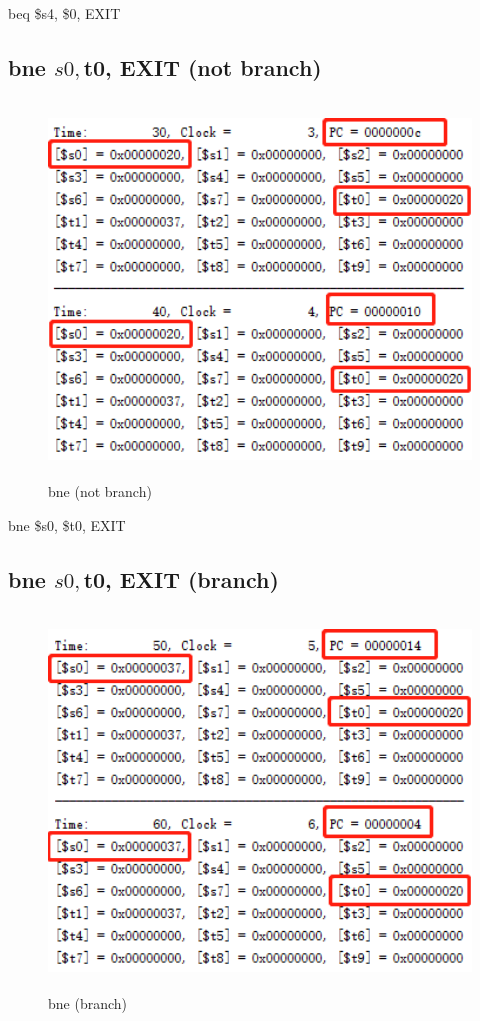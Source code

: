 \documentclass{article}
\begin{document}
beq \$s4, \$0, EXIT

\subsection{bne $s0, $t0, EXIT (not branch)}

\begin{figure}[H]
    \centering
    \includegraphics[height = 10cm,width = 13cm]{bne_not.png}
    \caption{bne (not branch)}
    \label{fig:my_label}
\end{figure}

bne \$s0, \$t0, EXIT

\subsection{bne $s0, $t0, EXIT (branch)}

\begin{figure}[H]
    \centering
    \includegraphics[height = 10cm,width = 13cm]{bne.png}
    \caption{bne (branch)}
    \label{fig:my_label}
\end{figure}
\end{document}
